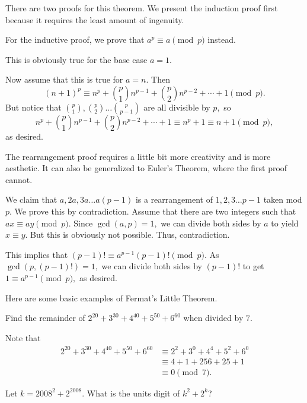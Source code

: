 \documentclass{article}
\begin{document}
There are two proofs for this theorem. We present the induction proof first because it requires the least amount of ingenuity.
\begin{pro}[1 (Induction)]
For the inductive proof, we prove that $a^p\equiv a\pmod{p}$ instead.

This is obviously true for the base case $a=1.$

Now assume that this is true for $a=n.$ Then
\[(n+1)^p\equiv n^p+\binom{p}{1}n^{p-1}+\binom{p}{2}n^{p-2}+\cdots+1\pmod{p}.\]
But notice that $\binom{p}{1},\binom{p}{2}\dots\binom{p}{p-1}$ are all divisible by $p,$ so
\[n^p+\binom{p}{1}n^{p-1}+\binom{p}{2}n^{p-2}+\cdots+1\equiv n^p+1\equiv n+1 \pmod{p},\]
as desired.
\end{pro}
The rearrangement proof requires a little bit more creativity and is more aesthetic. It can also be generalized to Euler's Theorem, where the first proof cannot.
\begin{pro}[2 (Rearrangement)]
We claim that $a,2a,3a\dots a(p-1)$ is a rearrangement of $1,2,3\dots p-1$ taken mod $p.$ We prove this by contradiction. Assume that there are two integers such that $ax\equiv ay \pmod{p}.$ Since $\gcd(a,p)=1,$ we can divide both sides by $a$ to yield $x\equiv y.$ But this is obviously not possible. Thus, contradiction.

This implies that $(p-1)!\equiv a^{p-1}(p-1)! \pmod{p}.$ As $\gcd(p,(p-1)!)=1,$ we can divide both sides by $(p-1)!$ to get $1\equiv a^{p-1}\pmod{p},$ as desired.
\end{pro}

Here are some basic examples of Fermat's Little Theorem.

\begin{exam}
Find the remainder of $2^{20} + 3^{30} + 4^{40} + 5^{50} + 6^{60}$ when divided by $7.$
\end{exam}

\begin{sol}
Note that
\begin{align*}
2^{20} + 3^{30} + 4^{40} + 5^{50} + 6^{60}&\equiv 2^2+3^0+4^4+5^2+6^0\\
&\equiv 4+1+256+25+1 \\
&\equiv 0\pmod{7}.
\end{align*}
\end{sol}

\begin{exam}[AMC 12A 2008/15]
Let $k={2008}^{2}+{2}^{2008}$. What is the units digit of $k^2+2^k$?
\end{exam}
\end{document}
